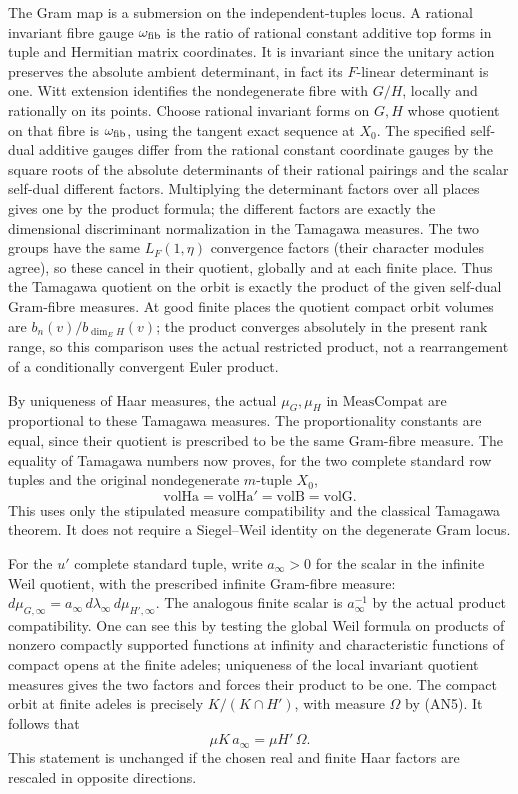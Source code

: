 The Gram map is a submersion on the independent-tuples locus.
A rational invariant fibre gauge \(\omega_{\rm fib}\) is the ratio
of rational constant additive top forms in tuple and Hermitian
matrix coordinates. It is invariant since the unitary action
preserves the absolute ambient determinant, in fact its
\(F\)-linear determinant is one. Witt extension identifies the
nondegenerate fibre with \(G/H\), locally and rationally on its
points. Choose rational invariant forms on \(G,H\) whose quotient
on that fibre is \(\omega_{\rm fib}\), using the tangent exact
sequence at \(X_0\). The specified self-dual additive gauges differ
from the rational constant coordinate gauges by the square roots
of the absolute determinants of their rational pairings and the
scalar self-dual different factors. Multiplying the determinant
factors over all places gives one by the product formula;
the different factors are exactly the dimensional discriminant
normalization in the Tamagawa measures. The two groups have the
same \(L_F(1,\eta)\) convergence factors (their character modules
agree), so these cancel in their quotient, globally and at each
finite place. Thus the Tamagawa quotient on the orbit is exactly
the product of the given self-dual Gram-fibre measures. At good
finite places the quotient compact orbit volumes are
\(b_n(v)/b_{\dim_E H}(v)\); the product converges absolutely in
the present rank range, so this comparison uses the actual
restricted product, not a rearrangement of a conditionally
convergent Euler product.

By uniqueness of Haar measures, the actual \(\mu_G,\mu_H\)
in \(\mathrm{MeasCompat}\) are proportional to these Tamagawa
measures. The proportionality constants are equal, since their
quotient is prescribed to be the same Gram-fibre measure.
The equality of Tamagawa numbers now proves, for the two
complete standard row tuples and the original nondegenerate
\(m\)-tuple \(X_0\),
\[
      \mathrm{volHa}=\mathrm{volHa}'=\mathrm{volB}=\mathrm{volG}.
                                                               \tag{AN8}
\]
This uses only the stipulated measure compatibility and the
classical Tamagawa theorem. It does not require a Siegel--Weil
identity on the degenerate Gram locus.

For the \(u'\) complete standard tuple, write \(a_\infty>0\)
for the scalar in the infinite Weil quotient, with the
prescribed infinite Gram-fibre measure:
\(d\mu_{G,\infty}=a_\infty\,d\lambda_\infty\,d\mu_{H',\infty}\).
The analogous finite scalar is \(a_\infty^{-1}\) by the
actual product compatibility. One can see this by testing the
global Weil formula on products of nonzero compactly supported
functions at infinity and characteristic functions of compact
opens at the finite adeles; uniqueness of the local invariant
quotient measures gives the two factors and forces their
product to be one. The compact orbit at finite adeles is
precisely \(K/(K\cap H')\), with measure \(\Omega\) by (AN5).
It follows that
\[
                    \mu K\,a_\infty=\mu H'\,\Omega.     \tag{AN9}
\]
This statement is unchanged if the chosen real and finite
Haar factors are rescaled in opposite directions.

